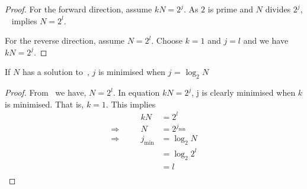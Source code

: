 \documentclass{article}
\begin{document}
\begin{proof}
For the forward direction, assume $kN=2^j$. As $2$ is prime and $N$ divides $2^j$, ~ implies $N=2^l$.

For the reverse direction, assume $N=2^l$. Choose $k=1$ and $j=l$ and we have $kN=2^j$.
\end{proof}

\begin{corollary}
If $N$ has a solution to~, $j$ is minimised when $j$ = $\log_2 N$
\end{corollary}

\begin{proof}
From~ we have, $N=2^l$. In equation $kN=2^j$, j is clearly minimised when $k$ is minimised. That is, $k=1$. This implies
\begin{equation}
\begin{alignedat}{2}
&& kN &= 2^l \\
\Rightarrow\quad && N &= 2^{j_\text{min}} \\
\Rightarrow\quad && j_\text{min} &= \log_2 N \\
&& &= \log_2 2^l \\
&& &= l \\
\end{alignedat}
\end{equation}
\end{proof}
\end{document}
